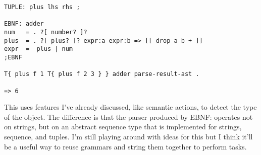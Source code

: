 \begin{verbatim}
TUPLE: plus lhs rhs ;

EBNF: adder
num   = . ?[ number? ]? 
plus  = . ?[ plus? ]? expr:a expr:b => [[ drop a b + ]]
expr  =  plus | num
;EBNF

T{ plus f 1 T{ plus f 2 3 } } adder parse-result-ast .

=> 6
\end{verbatim}

This uses features I've already discussed, like semantic actions, to
detect the type of the object. The difference is that the parser
produced by EBNF: operates not on strings, but on an abstract sequence
type that is implemented for strings, sequence, and tuples. I'm still
playing around with ideas for this but I think it'll be a useful way
to reuse grammars and string them together to perform tasks.
